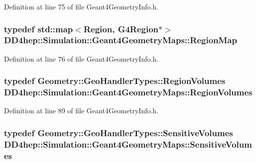 Definition at line 75 of file Geant4GeometryInfo.h.\hypertarget{namespace_d_d4hep_1_1_simulation_1_1_geant4_geometry_maps_afb7f77d7599fee831bfb2341123e8377}{
\subsubsection[{RegionMap}]{\setlength{\rightskip}{0pt plus 5cm}typedef std::map$<$Region, G4Region$\ast$$>$ {\bf DD4hep::Simulation::Geant4GeometryMaps::RegionMap}}}
\label{namespace_d_d4hep_1_1_simulation_1_1_geant4_geometry_maps_afb7f77d7599fee831bfb2341123e8377}


Definition at line 76 of file Geant4GeometryInfo.h.\hypertarget{namespace_d_d4hep_1_1_simulation_1_1_geant4_geometry_maps_a9fc457ad93d6235197e7e1ab013d1f56}{
\subsubsection[{RegionVolumes}]{\setlength{\rightskip}{0pt plus 5cm}typedef {\bf Geometry::GeoHandlerTypes::RegionVolumes} {\bf DD4hep::Simulation::Geant4GeometryMaps::RegionVolumes}}}
\label{namespace_d_d4hep_1_1_simulation_1_1_geant4_geometry_maps_a9fc457ad93d6235197e7e1ab013d1f56}


Definition at line 89 of file Geant4GeometryInfo.h.\hypertarget{namespace_d_d4hep_1_1_simulation_1_1_geant4_geometry_maps_a4b4bd41ff250c41737c7a73223fab910}{
\subsubsection[{SensitiveVolumes}]{\setlength{\rightskip}{0pt plus 5cm}typedef {\bf Geometry::GeoHandlerTypes::SensitiveVolumes} {\bf DD4hep::Simulation::Geant4GeometryMaps::SensitiveVolumes}}}
\label{namespace_d_d4hep_1_1_simulation_1_1_geant4_geometry_maps_a4b4bd41ff250c41737c7a73223fab910}


